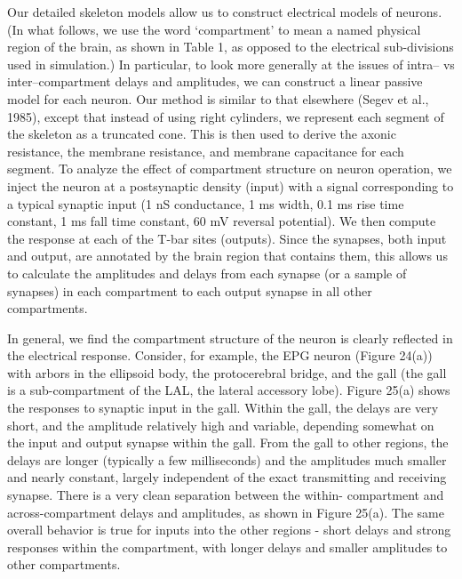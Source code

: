 \documentclass{article}
\begin{document}
Our detailed skeleton models allow us to construct electrical models of neurons. (In what follows, we use the word ‘compartment’ to mean a named physical region of the brain, as shown in Table 1, as opposed to the electrical sub-divisions used in simulation.) In particular, to look more generally at the issues of intra– vs inter–compartment delays and amplitudes, we can construct a linear passive model for each neuron. Our method is similar to that elsewhere (Segev et al., 1985), except that instead of using right cylinders, we represent each segment of the skeleton as a truncated cone. This is then used to derive the axonic resistance, the membrane resistance, and membrane capacitance for each segment. To analyze the effect of compartment structure on neuron operation, we inject the neuron at a postsynaptic density (input) with a signal corresponding to a typical synaptic input (1 nS conductance, 1 ms width, 0.1 ms rise time constant, 1 ms fall time constant, 60 mV reversal potential). We then compute the response at each of the T-bar sites (outputs). Since the synapses, both input and output, are annotated by the brain region that contains them, this allows us to calculate the amplitudes and delays from each synapse (or a sample of synapses) in each compartment to each output synapse in all other compartments.

In general, we find the compartment structure of the neuron is clearly reflected in the electrical response. Consider, for example, the EPG neuron (Figure 24(a)) with arbors in the ellipsoid body, the protocerebral bridge, and the gall (the gall is a sub-compartment of the LAL, the lateral accessory lobe). Figure 25(a) shows the responses to synaptic input in the gall. Within the gall, the delays are very short, and the amplitude relatively high and variable, depending somewhat on the input and output synapse within the gall. From the gall to other regions, the delays are longer (typically a few milliseconds) and the amplitudes much smaller and nearly constant, largely independent of the exact transmitting and receiving synapse. There is a very clean separation between the within- compartment and across-compartment delays and amplitudes, as shown in Figure 25(a). The same overall behavior is true for inputs into the other regions - short delays and strong responses within the compartment, with longer delays and smaller amplitudes to other compartments.
\end{document}
